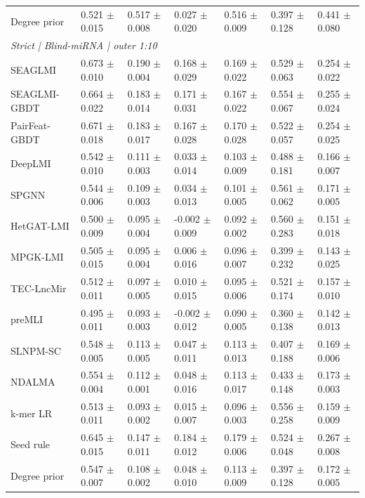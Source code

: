 \begin{landscape}
{\begin{longtable}{lllllll}
Degree prior & 0.521 $\pm$ 0.015 & 0.517 $\pm$ 0.008 & 0.027 $\pm$ 0.020 & 0.516 $\pm$ 0.009 & 0.397 $\pm$ 0.128 & 0.441 $\pm$ 0.080 \\
\multicolumn{7}{l}{\textit{Strict | Blind-miRNA | outer 1:10}}\\
SEAGLMI & 0.673 $\pm$ 0.010 & 0.190 $\pm$ 0.004 & 0.168 $\pm$ 0.029 & 0.169 $\pm$ 0.022 & 0.529 $\pm$ 0.063 & 0.254 $\pm$ 0.022 \\
SEAGLMI-GBDT & 0.664 $\pm$ 0.022 & 0.183 $\pm$ 0.014 & 0.171 $\pm$ 0.031 & 0.167 $\pm$ 0.022 & 0.554 $\pm$ 0.067 & 0.255 $\pm$ 0.024 \\
PairFeat-GBDT & 0.671 $\pm$ 0.018 & 0.183 $\pm$ 0.017 & 0.167 $\pm$ 0.028 & 0.170 $\pm$ 0.028 & 0.522 $\pm$ 0.057 & 0.254 $\pm$ 0.025 \\
DeepLMI & 0.542 $\pm$ 0.010 & 0.111 $\pm$ 0.003 & 0.033 $\pm$ 0.014 & 0.103 $\pm$ 0.009 & 0.488 $\pm$ 0.181 & 0.166 $\pm$ 0.007 \\
SPGNN & 0.544 $\pm$ 0.006 & 0.109 $\pm$ 0.003 & 0.034 $\pm$ 0.013 & 0.101 $\pm$ 0.005 & 0.561 $\pm$ 0.062 & 0.171 $\pm$ 0.005 \\
HetGAT-LMI & 0.500 $\pm$ 0.009 & 0.095 $\pm$ 0.004 & -0.002 $\pm$ 0.009 & 0.092 $\pm$ 0.002 & 0.560 $\pm$ 0.283 & 0.151 $\pm$ 0.018 \\
MPGK-LMI & 0.505 $\pm$ 0.015 & 0.095 $\pm$ 0.004 & 0.006 $\pm$ 0.016 & 0.096 $\pm$ 0.007 & 0.399 $\pm$ 0.232 & 0.143 $\pm$ 0.025 \\
TEC-LncMir & 0.512 $\pm$ 0.011 & 0.097 $\pm$ 0.005 & 0.010 $\pm$ 0.015 & 0.095 $\pm$ 0.006 & 0.521 $\pm$ 0.174 & 0.157 $\pm$ 0.010 \\
preMLI & 0.495 $\pm$ 0.011 & 0.093 $\pm$ 0.003 & -0.002 $\pm$ 0.012 & 0.090 $\pm$ 0.005 & 0.360 $\pm$ 0.138 & 0.142 $\pm$ 0.013 \\
SLNPM-SC & 0.548 $\pm$ 0.005 & 0.113 $\pm$ 0.005 & 0.047 $\pm$ 0.011 & 0.113 $\pm$ 0.013 & 0.407 $\pm$ 0.188 & 0.169 $\pm$ 0.006 \\
NDALMA & 0.554 $\pm$ 0.004 & 0.112 $\pm$ 0.001 & 0.048 $\pm$ 0.016 & 0.113 $\pm$ 0.017 & 0.433 $\pm$ 0.148 & 0.173 $\pm$ 0.003 \\
k-mer LR & 0.513 $\pm$ 0.011 & 0.093 $\pm$ 0.002 & 0.015 $\pm$ 0.007 & 0.096 $\pm$ 0.003 & 0.556 $\pm$ 0.258 & 0.159 $\pm$ 0.009 \\
Seed rule & 0.645 $\pm$ 0.015 & 0.147 $\pm$ 0.011 & 0.184 $\pm$ 0.012 & 0.179 $\pm$ 0.006 & 0.524 $\pm$ 0.048 & 0.267 $\pm$ 0.008 \\
Degree prior & 0.547 $\pm$ 0.007 & 0.108 $\pm$ 0.002 & 0.048 $\pm$ 0.010 & 0.113 $\pm$ 0.009 & 0.397 $\pm$ 0.128 & 0.172 $\pm$ 0.005 \\

\end{longtable}}
\end{landscape}
